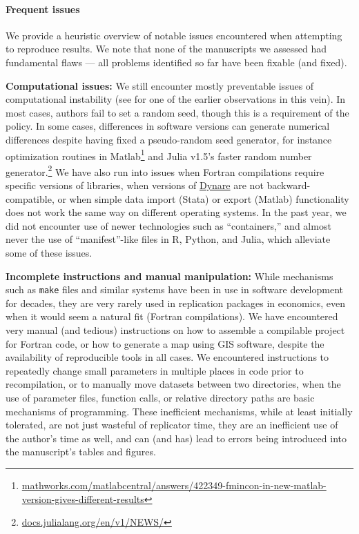 \documentclass[PP]{AEA}
\renewcommand{\subparagraph}[1]{\textbf{#1}}
\begin{document}
\paragraph{Frequent issues}

We provide a heuristic overview of notable issues  encountered when attempting to reproduce results. We note that none of the \jiramcs{} manuscripts we assessed had  fundamental flaws --- all problems identified so far have been fixable (and fixed). 

\subparagraph{Computational issues:}  We still encounter mostly preventable issues of computational instability (see \citet{mccullough_numerical_1999} for one of the earlier observations in this vein). In most cases, authors fail to set a random seed, though this is a requirement of the policy. In some cases, differences in software versions can generate numerical differences despite having fixed a pseudo-random seed generator, for instance optimization routines in Matlab\footnote{\href{https://it.mathworks.com/matlabcentral/answers/422349-fmincon-in-new-matlab-version-gives-different-results}{mathworks.com/matlabcentral/answers/422349-fmincon-in-new-matlab-version-gives-different-results}} and Julia v1.5's faster random number generator.\footnote{\href{https://web.archive.org/web/20201216032133/https://docs.julialang.org/en/v1/NEWS/}{docs.julialang.org/en/v1/NEWS/}} We have also run into issues when Fortran compilations require specific versions of libraries, when versions of \href{https://www.dynare.org/}{Dynare} are not backward-compatible, or when simple data import (Stata) or export (Matlab) functionality does not work the same way on different operating systems. In the past year, we did not encounter use of newer technologies such as ``containers,'' and almost never the use of ``manifest''-like files in R, Python, and Julia, which alleviate some of these issues.  

\subparagraph{Incomplete instructions and manual manipulation:} While mechanisms such as \texttt{make} files and similar systems have been in use in software development for decades, they are very rarely used in replication packages in economics, even when it would seem a natural fit (Fortran compilations). We have encountered very manual (and tedious) instructions on how to assemble a compilable project for Fortran code, or how to generate a map using GIS software, despite the availability of reproducible tools in all cases. We encountered instructions to repeatedly change small parameters in multiple places in code prior to recompilation, or to manually move datasets between two directories, when the use of parameter files, function calls, or relative directory paths are basic mechanisms of programming. These inefficient mechanisms, while at least initially tolerated, are not just wasteful of replicator time, they are an inefficient use of the author's time as well, and can (and has) lead to errors being introduced into the manuscript's tables and figures. 
\end{document}
